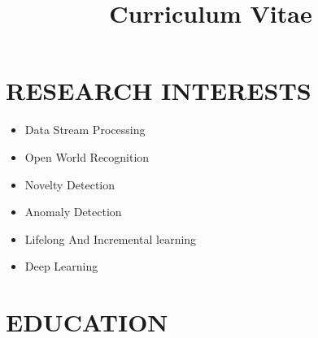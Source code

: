 \documentclass[10pt,a4paper,sans]{moderncv} %
\title{Curriculum Vitae}
\begin{document}
	
\makecvtitle




\section{RESEARCH INTERESTS}
\begin{itemize}
	\item{Data Stream Processing}
	\vspace{3pt}
	\item{Open World Recognition}
	\vspace{3pt}
	\item{Novelty Detection}
	\vspace{3pt}
	\item{Anomaly Detection}
	\vspace{3pt}
	\item{Lifelong And Incremental learning}
	\vspace{3pt}
	\item{Deep Learning}
	\vspace{3pt}
	
\end{itemize}

\section{EDUCATION}
\end{document}

